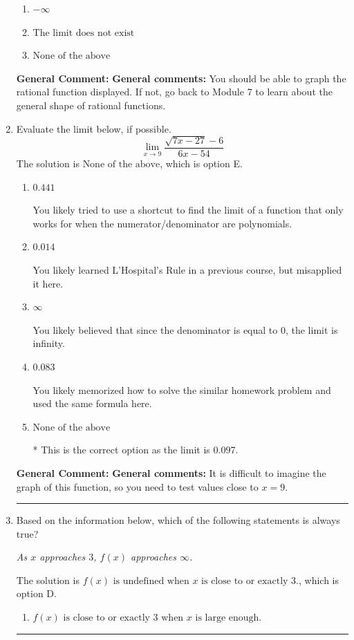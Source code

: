 \documentclass{extbook}[14pt]
\newcommand{\litem}[1]{\item #1

\rule{\textwidth}{0.4pt}}
\begin{document}
\begin{enumerate}
{\begin{enumerate}[label=\Alph*.]
\item \( -\infty \)


\item \( \text{The limit does not exist} \)


\item \( \text{None of the above} \)


\end{enumerate}

\textbf{General Comment:} \textbf{General comments:} You should be able to graph the rational function displayed. If not, go back to Module 7 to learn about the general shape of rational functions.
}
\litem{
Evaluate the limit below, if possible.
\[ \lim_{x \rightarrow 9} \frac{\sqrt{7x - 27} - 6}{6x - 54} \]The solution is \( \text{None of the above} \), which is option E.\begin{enumerate}[label=\Alph*.]
\item \( 0.441 \)

You likely tried to use a shortcut to find the limit of a function that only works for when the numerator/denominator are polynomials.
\item \( 0.014 \)

You likely learned L'Hospital's Rule in a previous course, but misapplied it here.
\item \( \infty \)

You likely believed that since the denominator is equal to 0, the limit is infinity.
\item \( 0.083 \)

You likely memorized how to solve the similar homework problem and used the same formula here.
\item \( \text{None of the above} \)

* This is the correct option as the limit is 0.097.
\end{enumerate}

\textbf{General Comment:} \textbf{General comments:} It is difficult to imagine the graph of this function, so you need to test values close to $x = 9$.
}
\litem{
Based on the information below, which of the following statements is always true?

\begin{center}
    \textit{ As $x$ approaches $3$, $f(x)$ approaches $\infty$. }
\end{center}
The solution is \( f(x) \text{ is undefined when } x \text{ is close to or exactly } 3. \), which is option D.\begin{enumerate}[label=\Alph*.]
\item \( f(x) \text{ is close to or exactly } 3 \text{ when } x \text{ is large enough}. \)



\end{enumerate}}
\end{enumerate}
\end{document}
